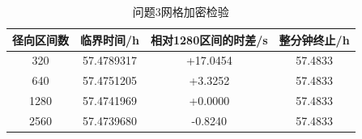 \begin{table}[H]
    \centering
    \small
    \renewcommand{\arraystretch}{0.82}

    \caption{问题3网格加密检验}
    \label{tab:q3_convergence}

    \begin{tabular*}{0.80\textwidth}
        {@{\extracolsep{\fill}}cccc@{}}
        \toprule
        径向区间数 & 临界时间/h & 相对1280区间的时差/s & 整分钟终止/h \\
        \midrule
        320  & 57.4789317 & +17.0454 & 57.4833 \\
        640  & 57.4751205 & +3.3252  & 57.4833 \\
        1280 & 57.4741969 & +0.0000  & 57.4833 \\
        2560 & 57.4739680 & -0.8240  & 57.4833 \\
        \bottomrule
    \end{tabular*}
\end{table}

